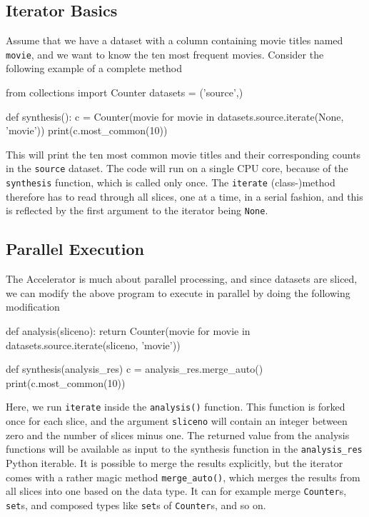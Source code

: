 \documentclass[a4paper]{article}
\begin{document}
\subsection{Iterator Basics}

Assume that we have a dataset with a column containing movie titles
named \texttt{movie}, and we want to know the ten most frequent
movies.  Consider the following example of a complete method
\begin{python}
from collections import Counter
datasets = ('source',)

def synthesis():
    c = Counter(movie for movie in datasets.source.iterate(None, 'movie'))
    print(c.most_common(10))
\end{python}
This will print the ten most common movie titles and their
corresponding counts in the \texttt{source} dataset.  The code will
run on a single CPU core, because of the \texttt{synthesis} function,
which is called only once.  The \texttt{iterate} (class-)method
therefore has to read through all slices, one at a time, in a serial
fashion, and this is reflected by the first argument to the iterator
being \texttt{None}.



\subsection{Parallel Execution}
The Accelerator is much about parallel processing, and since datasets
are sliced, we can modify the above program to execute in parallel by
doing the following modification
\begin{python}
def analysis(sliceno):
    return Counter(movie for movie in datasets.source.iterate(sliceno, 'movie'))

def synthesis(analysis_res)
    c = analysis_res.merge_auto()
    print(c.most_common(10))
\end{python}
Here, we run \texttt{iterate} inside the \texttt{analysis()} function.
This function is forked once for each slice, and the argument
\texttt{sliceno} will contain an integer between zero and the number
of slices minus one.  The returned value from the analysis functions
will be available as input to the synthesis function in the
\texttt{analysis\_res} Python iterable.  It is possible to merge the
results explicitly, but the iterator comes with a rather magic method
\texttt{merge\_auto()}, which merges the results from all slices into
one based on the data type.  It can for example merge
\texttt{Counter}s, \texttt{set}s, and composed types like
\texttt{set}s of \texttt{Counter}s, and so on.
\end{document}
